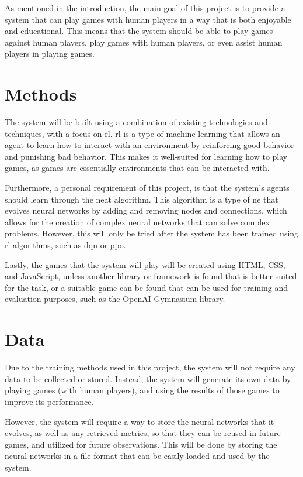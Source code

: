 As mentioned in the \hyperref[ch:intro]{introduction}, the main goal of this
project is to provide a system that can play games with human players in a way
that is both enjoyable and educational. This means that the system should be
able to play games against human players, play games with human players, or
even assist human players in playing games.

\section{Methods}\label{sec:methodology-methods}
The system will be built using a combination of existing technologies and
techniques, with a focus on \gls{rl}. \gls{rl} is a type of machine learning
that allows an agent to learn how to interact with an environment by
reinforcing good behavior and punishing bad behavior. This makes it well-suited
for learning how to play games, as games are essentially environments that can
be interacted with.

Furthermore, a personal requirement of this project, is that the system's 
agents should learn through the \gls{neat} algorithm. This algorithm is a type
of \gls{ne} that evolves neural networks by adding and removing nodes and
connections, which allows for the creation of complex neural networks that can
solve complex problems. However, this will only be tried after the system has
been trained using \gls{rl} algorithms, such as \gls{dqn} or \gls{ppo}. 

Lastly, the games that the system will play will be created using HTML, CSS,
and JavaScript, unless another library or framework is found that is better
suited for the task, or a suitable game can be found that can be used for
training and evaluation purposes, such as the OpenAI Gymnasium library.

\section{Data}\label{sec:methodology-data}
Due to the training methods used in this project, the system will not require
any data to be collected or stored. Instead, the system will generate its own
data by playing games (with human players), and using the results of those
games to improve its performance.

However, the system will require a way to store the neural networks that it
evolves, as well as any retrieved metrics, so that they can be reused in future
games, and utilized for future observations. This will be done by storing the
neural networks in a file format that can be easily loaded and used by the
system.


